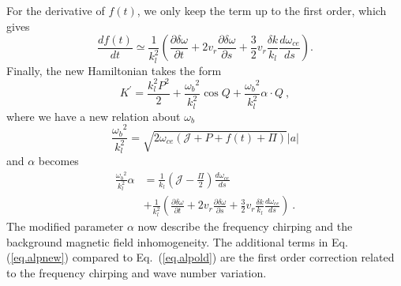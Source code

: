 For the derivative of $f(t)$, we only keep the term up to the first order, which gives
\begin{equation}
    \frac{d f(t)}{d t} \simeq \frac{1}{k_l^2}(\frac{\partial \delta \omega}{\partial t} + 2 v_r \frac{\partial \delta \omega}{\partial s} + \frac{3}{2}v_r\frac{\delta k}{k_l} \frac{d \omega_{ce}}{d s}  ).
\end{equation}
Finally, the new Hamiltonian takes the  form 
\begin{equation}\label{eq.H_frame}
    K^\prime = \frac{k_l^2 P^2}{2} + \frac{{\omega_{b}}^2}{k_l^2} \cos Q +\frac{{\omega_{b}}^2}{k_l^2} \alpha \cdot Q~,
\end{equation}
where we have a new relation about $\omega_{b}$
\begin{equation}\label{eq.wbnew}
    \frac{{\omega_{b}}^2}{k_l^2} = \sqrt{2\omega_{ce}(\mathcal{J}+P+f(t)+\Pi)}  |a|
\end{equation}
and $\alpha$ becomes
\begin{equation}\label{eq.alpnew}
    \begin{aligned}
    \frac{{\omega_{b}}^2}{k_l^2}\alpha & = \frac{1}{k_l}\left(\mathcal{J} - \frac{\Pi}{2}\right) \frac{d\omega_{ce}}{ds} \\
    & + \frac{1}{k_l^2}\left(\frac{\partial \delta \omega}{\partial t} + 2 v_r \frac{\partial \delta \omega}{\partial s} + \frac{3}{2}v_r\frac{\delta k}{k_l} \frac{d \omega_{ce}}{d s}\right)~.
    \end{aligned}
\end{equation}
The modified parameter $\alpha$ now describe the frequency chirping and the background magnetic field inhomogeneity.
The additional terms in Eq. (\ref{eq.alpnew}) compared to Eq.~(\ref{eq.alpold}) are the first order correction related to the frequency chirping and wave number variation.


